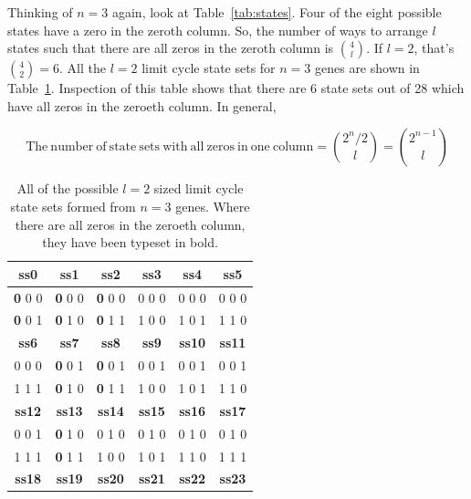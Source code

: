 \documentclass[11pt, a4paper]{article}
\begin{document}
Thinking of $n=3$ again, look at Table~\ref{tab:states}. Four of the
eight possible states have a zero in the zeroth column. So, the number
of ways to arrange $l$ states such that there are all zeros in the
zeroth column is $\binom{4}{l}$. If $l=2$, that's
$\binom{4}{2}=6$. All the $l=2$ limit cycle state sets for $n=3$ genes
are shown in Table~\ref{tab:n3l2}. Inspection of this table shows that
there are 6 state sets out of 28 which have all zeros in the zeroeth
column. In general,

\begin{equation}
\mathrm{The~number~of~state~sets~with~all~zeros~in~one~column}
= \binom{2^n/2}{l} = \binom{2^{n-1}}{l}
\end{equation}


\begin{table}[h!]
  \begin{center}
    \caption{All of the possible $l=2$ sized limit cycle state sets formed from
    $n=3$ genes. Where there are all zeros in the zeroeth column, they
    have been typeset in bold.}
    \label{tab:n3l2}
    \begin{tabular}{c|c|c|c|c|c}
      \textbf{ss0} & \textbf{ss1} & \textbf{ss2} & \textbf{ss3} &\textbf{ss4} & \textbf{ss5} \\
      \hline
      \textbf{0} 0 0       & \textbf{0} 0 0       & \textbf{0} 0 0       & 0 0 0       & 0 0 0      & 0 0 0       \\
      \textbf{0} 0 1       & \textbf{0} 1 0       & \textbf{0} 1 1       & 1 0 0       & 1 0 1      & 1 1 0       \\
      \hline
      \textbf{ss6} & \textbf{ss7} & \textbf{ss8} & \textbf{ss9} &\textbf{ss10} & \textbf{ss11} \\
      \hline
      0 0 0       & \textbf{0} 0 1       & \textbf{0} 0 1       & 0 0 1       & 0 0 1      & 0 0 1       \\
      1 1 1       & \textbf{0} 1 0       & \textbf{0} 1 1       & 1 0 0       & 1 0 1      & 1 1 0       \\
      \hline
      \textbf{ss12} & \textbf{ss13} & \textbf{ss14} & \textbf{ss15} &\textbf{ss16} & \textbf{ss17} \\
      \hline
      0 0 1       & \textbf{0} 1 0       & 0 1 0       & 0 1 0       & 0 1 0      & 0 1 0       \\
      1 1 1       & \textbf{0} 1 1       & 1 0 0       & 1 0 1       & 1 1 0      & 1 1 1       \\
      \hline
      \textbf{ss18} & \textbf{ss19} & \textbf{ss20} & \textbf{ss21} &\textbf{ss22} & \textbf{ss23} \\

\end{tabular}
\end{center}
\end{table}
\end{document}
